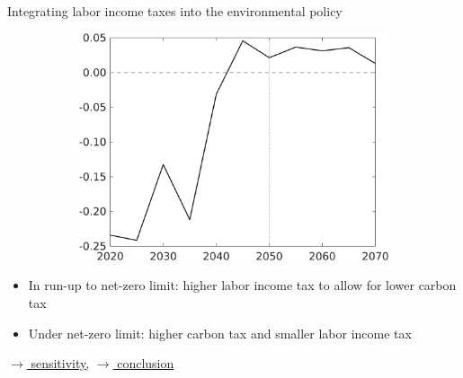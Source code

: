 \documentclass[11pt,aspectratio=169]{beamer}
\begin{document}
\begin{frame}{Integrating labor income taxes into the environmental policy}
\begin{figure}[h!!]
\begin{subfigure}{0.45\textwidth}
			\includegraphics[width=1\textwidth]{../codding_model/own_basedOnFried/optimalPol_010922_revision/figures/all_13Sept22/NewCalib_polTaulFixedPer_T_Tauf_Sun2_emnet1_spillover0_knspil3_xgr0_nsk0_sep0_extern0_PV1_etaa0.79.png}
		\end{subfigure}
	\end{figure}
	\vspace{3mm}	
	\begin{block}{}
		\begin{itemize}
			\item In run-up to net-zero limit: higher labor income tax to allow for lower carbon tax
			\item Under net-zero limit: higher carbon tax and smaller labor income tax
		\end{itemize}
	\end{block}	
	\vspace{-5.7mm}
	\hfill
	\hyperlink{sensphi}{\tiny{$\rightarrow$ sensitivity,}} 
	\hyperlink{conc}{\tiny{$\rightarrow$ conclusion}}
	\hypertarget{backmec}{}
\end{frame}
\end{document}
